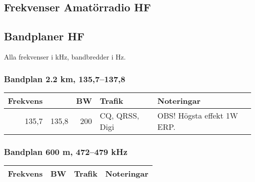 \begin{landscape}

\section{Frekvenser Amatörradio HF}


\subsection{Bandplaner HF}

Alla frekvenser i kHz, bandbredder i Hz.


\subsubsection{Bandplan 2.2 km, 135,7--137,8}
\begin{tabular}{rrrll}
\textbf{Frekvens} &  & \textbf{BW} & \textbf{Trafik} & \textbf{Noteringar} \\ \hline

135,7 & 135,8 & 200 & CQ, QRSS, Digi & OBS! Högsta effekt 1W ERP. \\ \hline
\end{tabular}

\subsubsection{Bandplan 600 m, 472--479 kHz}
\begin{tabular}{rrrll}
\multicolumn{2}{c}{\textbf{Frekvens}} & \textbf{BW} & \textbf{Trafik} & \textbf{Noteringar} \\ \hline


\end{tabular}
\end{landscape}
